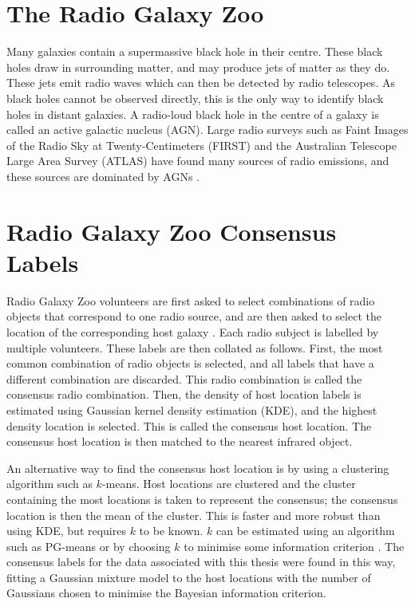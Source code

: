 \documentclass[11pt]{book}
\begin{document}
\section{The Radio Galaxy Zoo}
\label{sec:rgz}

    Many galaxies contain a supermassive black hole in their centre. These black holes draw in surrounding matter, and may produce jets of matter as they do. These jets emit radio waves  which can then be detected by radio telescopes. As black holes cannot be observed directly, this is the only way to identify black holes in distant galaxies. A radio-loud black hole in the centre of a galaxy is called an active galactic nucleus (AGN).  Large radio surveys such as Faint Images of the Radio Sky at Twenty-Centimeters (FIRST) \cite{white97, becker95} and the Australian Telescope Large Area Survey (ATLAS) \cite{franzen15} have found many sources of radio emissions, and these sources are dominated by AGNs \cite{banfield15}.

\section{Radio Galaxy Zoo Consensus Labels}
\label{sec:consensuses}
    
    Radio Galaxy Zoo volunteers are first asked to select combinations of radio objects that correspond to one radio source, and are then asked to select the location of the corresponding host galaxy \cite{banfield15}. Each radio subject is labelled by multiple volunteers. These labels are then collated as follows. First, the most common combination of radio objects is selected, and all labels that have a different combination are discarded. This radio combination is called the consensus radio combination. Then, the density of host location labels is estimated using Gaussian kernel density estimation (KDE), and the highest density location is selected. This is called the consensus host location. The consensus host location is then matched to the nearest infrared object.

    An alternative way to find the consensus host location is by using a clustering algorithm such as $k$-means. Host locations are clustered and the cluster containing the most locations is taken to represent the consensus; the consensus location is then the mean of the cluster. This is faster and more robust than using KDE, but requires $k$ to be known. $k$ can be estimated using an algorithm such as PG-means \cite{hamerly07} or by choosing $k$ to minimise some information criterion . The consensus labels for the data associated with this thesis were found in this way, fitting a Gaussian mixture model to the host locations with the number of Gaussians chosen to minimise the Bayesian information criterion.
\end{document}
